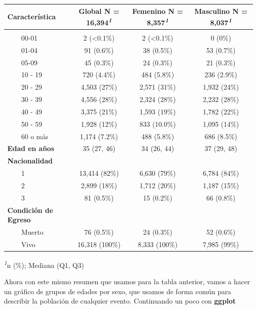 \documentclass[
  letterpaper,
  DIV=11,
  numbers=noendperiod]{scrreprt}
\begin{document}
\begin{table}
\fontsize{12.0pt}{14.4pt}\selectfont
\begin{tabular*}{\linewidth}{@{\extracolsep{\fill}}lccc}
\toprule
\textbf{Característica} & \textbf{Global}  N = 16,394\textsuperscript{\textit{1}} & \textbf{Femenino}  N = 8,357\textsuperscript{\textit{1}} & \textbf{Masculino}  N = 8,037\textsuperscript{\textit{1}} \\ 
\midrule\addlinespace[2.5pt]
{\bfseries Grupo de edad en años} &  &  &  \\ 
    00-01 & 2 (<0.1\%) & 2 (<0.1\%) & 0 (0\%) \\ 
    01-04 & 91 (0.6\%) & 38 (0.5\%) & 53 (0.7\%) \\ 
    05-09 & 45 (0.3\%) & 24 (0.3\%) & 21 (0.3\%) \\ 
    10 - 19 & 720 (4.4\%) & 484 (5.8\%) & 236 (2.9\%) \\ 
    20 - 29 & 4,503 (27\%) & 2,571 (31\%) & 1,932 (24\%) \\ 
    30 - 39 & 4,556 (28\%) & 2,324 (28\%) & 2,232 (28\%) \\ 
    40 - 49 & 3,375 (21\%) & 1,593 (19\%) & 1,782 (22\%) \\ 
    50 - 59 & 1,928 (12\%) & 833 (10.0\%) & 1,095 (14\%) \\ 
    60 o más & 1,174 (7.2\%) & 488 (5.8\%) & 686 (8.5\%) \\ 
{\bfseries Edad en años} & 35 (27, 46) & 34 (26, 44) & 37 (29, 48) \\ 
{\bfseries Nacionalidad} &  &  &  \\ 
    1 & 13,414 (82\%) & 6,630 (79\%) & 6,784 (84\%) \\ 
    2 & 2,899 (18\%) & 1,712 (20\%) & 1,187 (15\%) \\ 
    3 & 81 (0.5\%) & 15 (0.2\%) & 66 (0.8\%) \\ 
{\bfseries Condición de Egreso} &  &  &  \\ 
    Muerto & 76 (0.5\%) & 24 (0.3\%) & 52 (0.6\%) \\ 
    Vivo & 16,318 (100\%) & 8,333 (100\%) & 7,985 (99\%) \\ 
\bottomrule
\end{tabular*}
\begin{minipage}{\linewidth}
\textsuperscript{\textit{1}}n (\%); Mediana (Q1, Q3)\\
\end{minipage}
\end{table}

Ahora con este mismo resumen que usamos para la tabla anterior, vamos a
hacer un gráfico de grupos de edades por sexo, que usamos de forma común
para describir la población de cualquier evento. Continuando un poco con
\textbf{ggplot}
\end{document}

